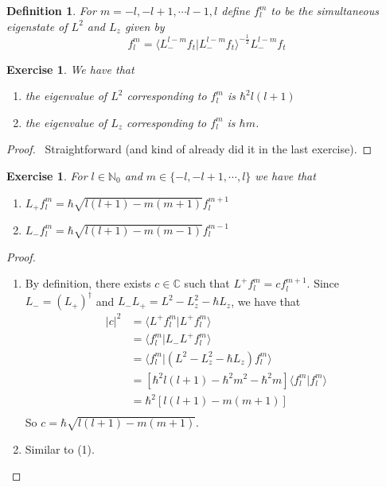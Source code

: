 \documentclass[12pt]{amsart}
\newtheorem{defn}[thm]{Definition}
\newtheorem{ex}[thm]{Exercise}
\renewcommand{\r}{\rangle}
\renewcommand{\l}{\langle}
\newcommand{\C}{\mathbb{C}}
\newcommand{\N}{\mathbb{N}}
\begin{document}
\begin{defn}
For $m = -l, -l+1, \cdots l-1, l$ define $f_l^m$ to be the simultaneous eigenstate of $L^2$ and $L_z$ given by $$f_l^m = \l L_-^{l-m}f_t \vert L_-^{l-m}f_t \r^{-\frac{1}{2}}  L_-^{l-m}f_t$$ 
\end{defn}

\begin{ex}We have that
\begin{enumerate}
\item the eigenvalue of $L^2$ corresponding to  $f_l^m$ is $\hbar^2 l(l+1)$ 
\item the eigenvalue of $L_z$ corresponding to $f_l^m$ is $\hbar m$.  
\end{enumerate}
\end{ex}

\begin{proof}\
Straightforward (and kind of already did it in the last exercise). 
\end{proof}

\begin{ex}
For $l \in \N_0$ and $m \in \{-l, -l+1, \cdots, l\}$ we have that 
\begin{enumerate}
\item $L_{+} f_l^m = \hbar \sqrt{l(l+1)-m(m + 1)} f_l^{m+ 1}$
\item $L_{-} f_l^m = \hbar \sqrt{l(l+1)-m(m - 1)} f_l^{m- 1}$
\end{enumerate}
\end{ex}

\begin{proof}
\begin{enumerate}
\item By definition, there exists $c \in \C$ such that $L^+ f_l^m = c f_l^{m+1}$. Since $L_- = (L_+)^{\dagger}$ and $L_-L_+ = L^2 -L_z^2 -\hbar L_z$, we have that 
\begin{align*}
|c|^2 
&= \l L^+ f_l^m | L^+ f_l^m \r \\
&= \l f_l^m | L_- L^+ f_l^m \r \\
&= \l f_l^m | (L^2 -L_z^2 -\hbar L_z) f_l^m \r \\
&= [\hbar^2l(l+1) - \hbar^2 m^2 - \hbar^2m] \l f_l^m | f_l^m \r \\
&= \hbar^2[l(l+1) - m(m + 1)] \\
\end{align*}
So $c = \hbar\sqrt{l(l+1) - m(m + 1)}$.
\item Similar to (1).
\end{enumerate}
\end{proof}
\end{document}

